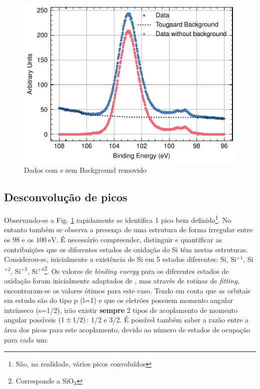 \documentclass[baaa]{baaa}
\begin{document}
\begin{figure}[t!]
    \centering
    \includegraphics[width=\columnwidth]{Figuras/data_init.pdf}
    \caption{Dados com e sem Background removido}
    \label{fig:bgrm}
  \end{figure}

\subsection{Desconvolução de picos}

Observando-se a Fig. \ref{fig:bgrm} rapidamente se identifica 1 pico bem definido\footnote{São, na realidade, vários picos convoluídos}. No entanto também se observa a presença de uma estrutura de forma irregular entre os 98 e os $100\ \si{\electronvolt}$. É necessário compreender, distinguir e quantificar as contribuições que os diferentes estados de oxidação do Si têm nestas estruturas. Considerou-se, inicialmente a existência de Si em 5 estados diferentes: Si, Si$^{+1}$, Si$^{+2}$, Si$^{+3}$, Si$^{+4}$\footnote{Corresponde a SiO$_2$}. Os valores de \textit{binding energy} para os diferentes estados de oxidação foram inicialmente adaptados de \cite{Himpsel}, mas através de rotinas de \textit{fitting}, encontraram-se os valores ótimos para este caso. Tendo em conta que as orbitais em estudo são do tipo p (l=1) e que os eletrões possuem momento angular intrínseco (s=1/2), irão  existir \textbf{sempre} 2 tipos de acoplamento de momento angular possíveis $\qty(1\pm 1/2)$: 1/2 e 3/2. É possível também saber a razão entre a área dos picos para este acoplamento, devido ao número de estados de ocupação para cada um:
\end{document}
